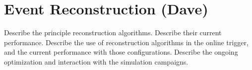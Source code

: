 \section{Event Reconstruction (Dave)}
Describe the principle reconstruction algorithms.  Describe their current performance.
Describe the use of reconstruction algorithms in the online trigger, and the current performance with those configurations.
Describe the ongoing optimization and interaction with the simulation campaigns.
